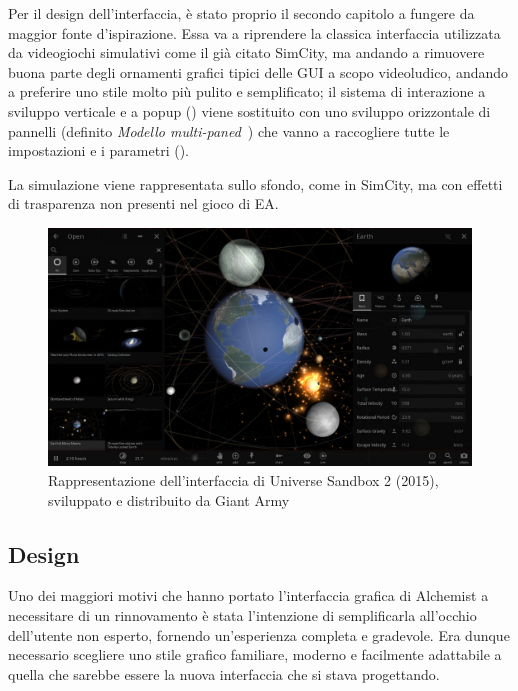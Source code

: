                 Per il design dell'interfaccia, è stato proprio il secondo capitolo a fungere da maggior fonte d'ispirazione. Essa va a riprendere la classica interfaccia utilizzata da videogiochi simulativi come il già citato SimCity, ma andando a rimuovere buona parte degli ornamenti grafici tipici delle GUI a scopo videoludico, andando a preferire uno stile molto più pulito e semplificato; il sistema di interazione a sviluppo verticale e a popup () viene sostituito con uno sviluppo orizzontale di pannelli (definito \emph{Modello multi-paned}~\cite{multipanedmodel}) che vanno a raccogliere tutte le impostazioni e i parametri ().

                La simulazione viene rappresentata sullo sfondo, come in SimCity, ma con effetti di trasparenza non presenti nel gioco di EA.

                \begin{figure}[htbp]
                    \centering
                    \includegraphics[scale=0.32]{img/universesandboxpanels}
                    \caption{Rappresentazione dell'interfaccia di Universe Sandbox 2 (2015), sviluppato e distribuito da Giant Army}
                    \label{fig:universesandboxpanels}
                \end{figure}

        \subsection{ Design}\label{sub:}
            Uno dei maggiori motivi che hanno portato l'interfaccia grafica di Alchemist a necessitare di un rinnovamento è stata l'intenzione di semplificarla all'occhio dell'utente non esperto, fornendo un'esperienza completa e gradevole.
            Era dunque necessario scegliere uno stile grafico familiare, moderno e facilmente adattabile a quella che sarebbe essere la nuova interfaccia che si stava progettando.

